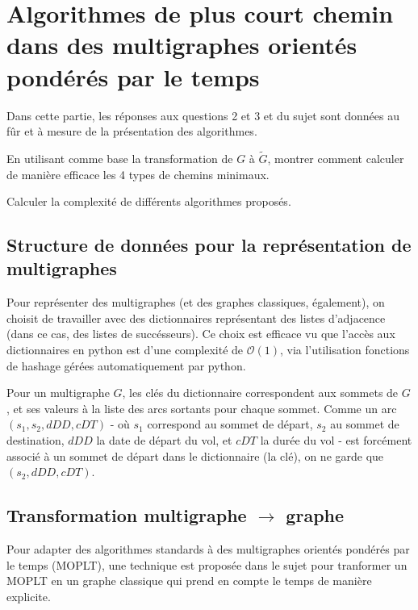 \section{Algorithmes de plus court chemin dans des multigraphes orientés pondérés par le temps}
\label{sec:algos}

Dans cette partie, les réponses aux questions 2 et 3 et du sujet sont données au
fûr et à mesure de la présentation des algorithmes.

\begin{question}
  En utilisant comme base la transformation de $G$ à $\tilde{G}$, montrer
  comment calculer de manière efficace les 4 types de chemins minimaux.
\end{question}

\begin{question}
  Calculer la complexité de différents algorithmes proposés.
\end{question}

\subsection{Structure de données pour la représentation de multigraphes}

Pour représenter des multigraphes (et des graphes classiques, également), on
choisit de travailler avec des dictionnaires représentant des listes d'adjacence
(dans ce cas, des listes de succésseurs). Ce choix est efficace vu que l'accès
aux dictionnaires en python est d'une complexité de $\mathcal{O}(1)$, via
l'utilisation fonctions de hashage gérées automatiquement par python.

Pour un multigraphe $G$, les clés du dictionnaire correspondent aux sommets de
$G$, et ses valeurs à la liste des arcs sortants pour chaque sommet. Comme un
arc $(s_1,s_2,dDD,cDT)$ - où $s_1$ correspond au sommet de départ, $s_2$ au
sommet de destination, $dDD$ la date de départ du vol, et $cDT$ la durée du vol
- est forcément associé à un sommet de départ dans le dictionnaire (la clé), on
ne garde que $(s_2,dDD,cDT)$.

\subsection{Transformation multigraphe $\rightarrow$ graphe}
\label{sec:transfo}

Pour adapter des algorithmes standards à des multigraphes orientés pondérés par
le temps (MOPLT), une technique est proposée dans le sujet pour tranformer un
MOPLT en un graphe classique qui prend en compte le temps de manière explicite.

